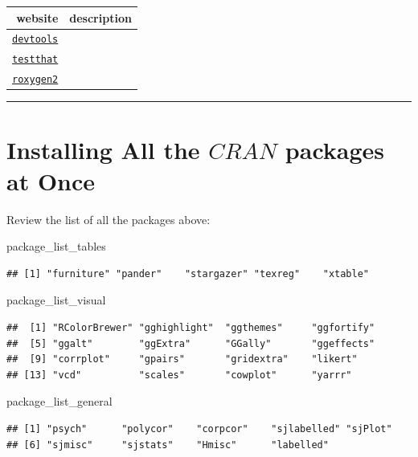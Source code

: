 \documentclass[]{book}
\newenvironment{Shaded}{\begin{snugshade}}{\end{snugshade}}
\newcommand{\NormalTok}[1]{#1}
\theoremstyle{definition}
\theoremstyle{definition}
\theoremstyle{definition}
\theoremstyle{remark}
\begin{document}
\begin{longtable}[]{@{}rl@{}}
\toprule
website & description\tabularnewline
\midrule
\endhead
\href{}{\texttt{devtools}} &\tabularnewline
\href{}{\texttt{testthat}} &\tabularnewline
\href{}{\texttt{roxygen2}} &\tabularnewline
\bottomrule
\end{longtable}

\begin{center}\rule{0.5\linewidth}{\linethickness}\end{center}

\section{\texorpdfstring{Installing All the \(CRAN\) packages at
Once}{Installing All the CRAN packages at Once}}\label{installing-all-the-cran-packages-at-once}

Review the list of all the packages above:

\begin{Shaded}
\begin{Highlighting}[]
\NormalTok{package_list_tables}
\end{Highlighting}
\end{Shaded}

\begin{verbatim}
## [1] "furniture" "pander"    "stargazer" "texreg"    "xtable"
\end{verbatim}

\begin{Shaded}
\begin{Highlighting}[]
\NormalTok{package_list_visual}
\end{Highlighting}
\end{Shaded}

\begin{verbatim}
##  [1] "RColorBrewer" "gghighlight"  "ggthemes"     "ggfortify"   
##  [5] "ggalt"        "ggExtra"      "GGally"       "ggeffects"   
##  [9] "corrplot"     "gpairs"       "gridextra"    "likert"      
## [13] "vcd"          "scales"       "cowplot"      "yarrr"
\end{verbatim}

\begin{Shaded}
\begin{Highlighting}[]
\NormalTok{package_list_general}
\end{Highlighting}
\end{Shaded}

\begin{verbatim}
## [1] "psych"      "polycor"    "corpcor"    "sjlabelled" "sjPlot"    
## [6] "sjmisc"     "sjstats"    "Hmisc"      "labelled"
\end{verbatim}
\end{document}
